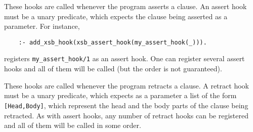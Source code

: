 \begin{description}
 

These hooks are called whenever the program asserts a clause. An assert
hook must be a unary predicate, which expects the clause
being asserted as a parameter. For instance,
\begin{verbatim}
    :- add_xsb_hook(xsb_assert_hook(my_assert_hook(_))).
\end{verbatim}
registers {\tt my\_assert\_hook/1} as an assert hook. One can register
several assert hooks and all of them will be called (but the order is not
guaranteed).

 

These hooks are called whenever the program retracts a clause. A retract
hook must be a unary predicate, which expects as a parameter a list of the
form {\tt [Head,Body]}, which represent the head and the body parts of the
clause being retracted. As with assert hooks, any number of retract hooks
can be registered and all of them will be called in some order.

\end{description}


